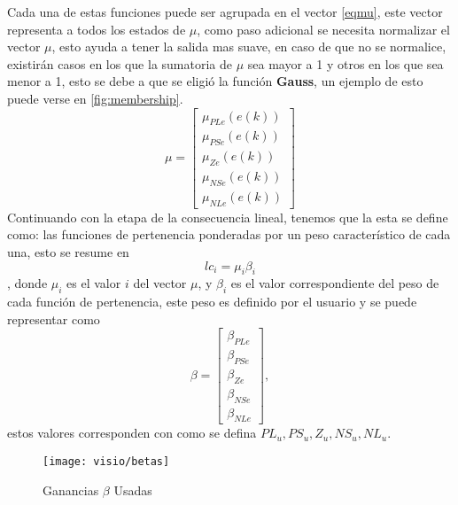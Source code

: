     
    Cada una de estas funciones puede ser agrupada en el vector \cref{eqmu}, este vector representa a todos los estados de $\mu$, como paso adicional se necesita normalizar el vector $\mu$, esto ayuda a tener la salida mas suave, en caso de que no se normalice, existirán casos en los que la sumatoria de $\mu$ sea mayor a 1 y otros en los que sea menor a 1, esto se debe a que se eligió la función \textbf{Gauss}, un ejemplo de esto puede verse en \cref{fig:membership}.
    \begin{equation}
    \label{eqmu}
    \mu=\begin{bmatrix}
    \mu_{PLe}(e(k)) \\ 
    \mu_{PSe}(e(k))\\ 
    \mu_{Ze}(e(k))\\ 
    \mu_{NSe}(e(k))\\ 
    \mu_{NLe}(e(k))
    \end{bmatrix} 
    \end{equation}
    Continuando con la etapa de la consecuencia lineal, tenemos que la esta se define como: las funciones de pertenencia ponderadas por un peso característico de cada una, esto se resume en \begin{equation} 
    lc_i= \mu_i \beta_i
    \end{equation}, donde $\mu_i$ es el valor $i$ del vector $\mu$, y $\beta_i$ es el valor correspondiente del peso de cada función de pertenencia, este peso es definido por el usuario y se puede representar como \begin{equation}
    \label{betav}
    \beta=\begin{bmatrix}
    \beta_{PLe} \\ 
    \beta_{PSe}\\ 
    \beta_{Ze}\\ 
    \beta_{NSe}\\ 
    \beta_{NLe}
    \end{bmatrix} , 
    \end{equation} estos valores corresponden con como se defina $PL_u,PS_u,Z_u,NS_u,NL_u $. %
    
    
\begin{figure}[h]
	\centering
	\texttt{[image: visio/betas]}
	\caption{Ganancias $\beta$ Usadas}
	\label{fig:betas}
\end{figure}
    
    
    
